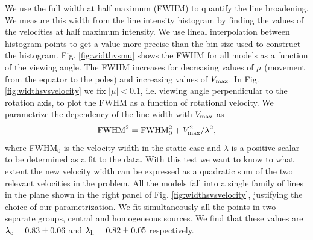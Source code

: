 We use the full width at half maximum (FWHM) to quantify the line
broadening.
We measure this width from the line intensity histogram by finding the
values of the velocities at half maximum intensity.
We use lineal interpolation between histogram points to get a value
more precise than the bin size used to construct the histogram.
Fig. \ref{fig:widthvsmu} shows the FWHM for all models as a function
of the viewing angle.
The FWHM increases for decreasing values of $\mu$ (movement from the
equator to the poles) and increasing values of $V_{\rm max}$.
In Fig.
\ref{fig:widthsvsvelocity} we fix $|\mu|<0.1$, i.e. viewing angle
perpendicular to the rotation axis, to plot the FWHM as a function of
rotational velocity.
We parametrize the dependency of the line width with $V_{\rm max}$ as
%
\begin{equation}
{\rm FWHM}^2 = {\rm FWHM}_{0}^2 + V_{\rm max}^2/\lambda^2,
\label{eq:fwhm}
\end{equation}
%
where FWHM$_{0}$ is the velocity width in the static case and $\lambda$
is a positive scalar to be determined as a fit to the data.
With this test we want to know to what extent the new velocity width can be
expressed as a quadratic sum of the two relevant velocities in the
problem.
All the models fall into a single family of lines in the plane shown
in the right panel of Fig. \ref{fig:widthsvsvelocity}, justifying
the choice of our parametrization.
We fit simultaneously all the points in two separate groups, central
and homogeneous sources.
We find that these values are $\lambda_{\rm c} = 0.83 \pm 0.06$ and
$\lambda_{\rm h}= 0.82\pm 0.05$ respectively.
